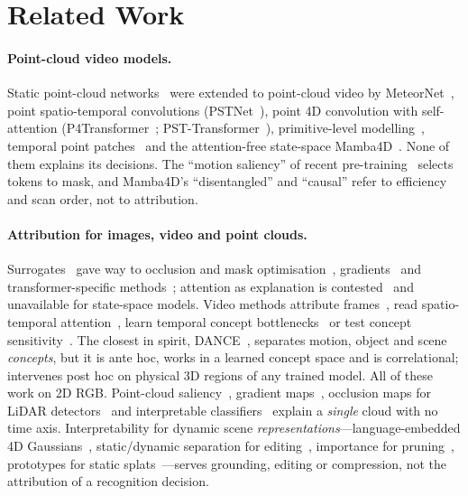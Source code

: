 \section{Related Work}
\label{sec:related}

\paragraph{Point-cloud video models.}
Static point-cloud networks~\cite{qi2017pointnet,qi2017pointnetpp,wang2019dgcnn,wu2024ptv3} were extended to point-cloud video by MeteorNet~\cite{liu2019meteornet}, point spatio-temporal convolutions (PSTNet~\cite{fan2021pstnet}), point 4D convolution with self-attention (P4Transformer~\cite{fan2021p4transformer}; PST-Transformer~\cite{fan2023psttransformer}), primitive-level modelling~\cite{wen2022pptr}, temporal point patches~\cite{benshabat2024_3dinaction} and the attention-free state-space Mamba4D~\cite{liu2025mamba4d}. None of them explains its decisions. The ``motion saliency'' of recent pre-training~\cite{wang2026mosaic} selects tokens to mask, and Mamba4D's ``disentangled'' and ``causal'' refer to efficiency and scan order, not to attribution.

\paragraph{Attribution for images, video and point clouds.}
Surrogates~\cite{ribeiro2016lime,lundberg2017shap} gave way to occlusion and mask optimisation~\cite{petsiuk2018rise,fong2019extremal}, gradients~\cite{selvaraju2017gradcam,sundararajan2017ig} and transformer-specific methods~\cite{abnar2020rollout,chefer2021transformer}; attention as explanation is contested~\cite{jain2019attention} and unavailable for state-space models. Video methods attribute frames~\cite{price2020playfair}, read spatio-temporal attention~\cite{wang2025staa}, learn temporal concept bottlenecks~\cite{knab2025motif,lee2025dance} or test concept sensitivity~\cite{videotcav2024}. The closest in spirit, DANCE~\cite{lee2025dance}, separates motion, object and scene \emph{concepts}, but it is ante hoc, works in a learned concept space and is correlational; \method intervenes post hoc on physical 3D regions of any trained model. All of these work on 2D RGB. Point-cloud saliency~\cite{zheng2019pointcloudsaliency}, gradient maps~\cite{tayyub2022ape}, occlusion maps for LiDAR detectors~\cite{schinagl2022occam} and interpretable classifiers~\cite{devries2025pointmil} explain a \emph{single} cloud with no time axis. Interpretability for dynamic scene \emph{representations}---language-embedded 4D Gaussians~\cite{fiebelman2025_4legs,li2025_4dlangsplat}, static/dynamic separation for editing~\cite{kwon2025instruct4dgs}, importance for pruning~\cite{zhang2024lp3dgs}, prototypes for static splats~\cite{galus2026xsplain}---serves grounding, editing or compression, not the attribution of a recognition decision.

